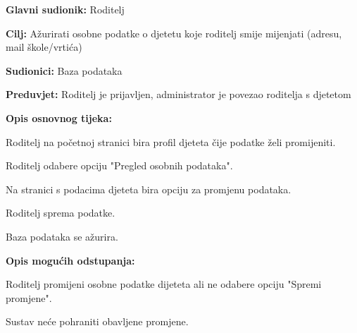 					\noindent {}
					\begin{packed_item}
						
						\item \textbf{Glavni sudionik: }Roditelj
						\item  \textbf{Cilj:} Ažurirati osobne podatke o djetetu koje roditelj smije mijenjati (adresu, mail škole/vrtića)
						\item  \textbf{Sudionici:} Baza podataka
						\item  \textbf{Preduvjet:} Roditelj je prijavljen, administrator je povezao roditelja s djetetom
						\item  \textbf{Opis osnovnog tijeka:}
						
						\item[] \begin{packed_enum}
							
							\item Roditelj na početnoj stranici bira profil djeteta čije podatke želi promijeniti. 
							\item Roditelj odabere opciju "Pregled osobnih podataka".
							\item Na stranici s podacima djeteta bira opciju za promjenu podataka.
							\item Roditelj sprema podatke.
							\item Baza podataka se ažurira.
						\end{packed_enum}
						
						\item  \textbf{Opis mogućih odstupanja:}
						
						\item[] \begin{packed_item}
							
							\item[4.a] Roditelj promijeni osobne podatke dijeteta ali ne odabere opciju "Spremi promjene".
							\item[] \begin{packed_enum}
								
								\item Sustav neće pohraniti obavljene promjene.
							\end{packed_enum}
							
						\end{packed_item}
					\end{packed_item}
					
